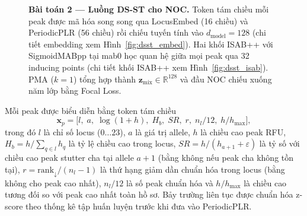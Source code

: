 \documentclass[12pt,a4paper]{article}
\begin{document}
\begin{figure}[H]
\centering
{}
\caption{\textbf{Bài toán 2 — Luồng DS-ST cho NOC.} Token tám chiều mỗi peak được mã hóa song song qua LocusEmbed (16 chiều) và PeriodicPLR (56 chiều) rồi chiếu tuyến tính vào $d_{\mathrm{model}}=128$ (chi tiết embedding xem Hình~\ref{fig:dsst_embed}). Hai khối ISAB++ với SigmoidMABpp tại mab0 học quan hệ giữa mọi peak qua 32 inducing points (chi tiết khối ISAB++ xem Hình~\ref{fig:dsst_isab}). PMA ($k{=}1$) tổng hợp thành $\bm{z}_{\mathrm{mix}}\in\mathbb{R}^{128}$ và đầu NOC chiếu xuống năm lớp bằng Focal Loss.}
\label{fig:settransv4}
\end{figure}

Mỗi peak được biểu diễn bằng token tám chiều
\begin{equation}
\bm{x}_p = \bigl[l,\;a,\;\log(1+h),\;H_b,\;SR,\;r,\;n_l/12,\;h/h_{\max}\bigr],
\end{equation}
trong đó $l$ là chỉ số locus ($0\ldots23$), $a$ là giá trị allele, $h$ là chiều cao peak RFU, $H_b=h/\sum_{q\in l}h_q$ là tỷ lệ chiều cao trong locus, $SR=h/(h_{a+1}+\varepsilon)$ là tỷ số với chiều cao peak stutter cha tại allele $a+1$ (bằng không nếu peak cha không tồn tại), $r=\mathrm{rank}_{\downarrow}/(n_l-1)$ là thứ hạng giảm dần chuẩn hóa trong locus (bằng không cho peak cao nhất), $n_l/12$ là số peak chuẩn hóa và $h/h_{\max}$ là chiều cao tương đối so với peak cao nhất toàn hồ sơ. Bảy trường liên tục được chuẩn hóa z-score theo thống kê tập huấn luyện trước khi đưa vào PeriodicPLR.
\end{document}
